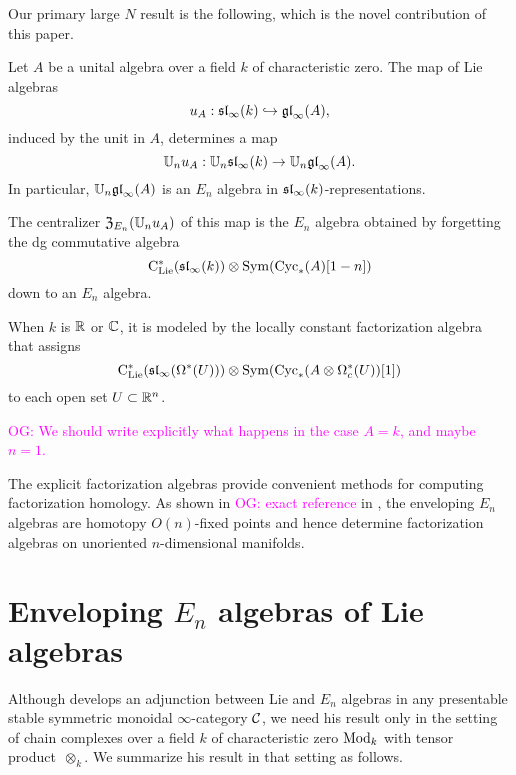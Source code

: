 \documentclass[11pt]{amsart}
\numberwithin{equation}{section}
\def\owen{\textcolor{magenta}{OG: }\textcolor{magenta}}
\begin{document}
Our primary large $N$ result is the following, which is the novel contribution of this paper.

\begin{thm}
\label{thm: large N}
Let $A$ be a unital algebra over a field $k$ of characteristic zero. 
The map of Lie algebras
\[
u_A: \sl_\infty(k) \hookrightarrow \gl_\infty(A),
\]
induced by the unit in $A$, determines a map 
\[
\UU_nu_A: \UU_n\sl_\infty(k) \to \UU_n\gl_\infty(A).
\]
In particular, $\UU_n\gl_\infty(A)$ is an $E_n$ algebra in $\sl_\infty(k)$-representations.

The centralizer ${\frak Z}_{E_n}(\UU_nu_A)$ of this map is the $E_n$ algebra obtained by forgetting the dg commutative algebra
\[
\clies(\sl_\infty(k)) \otimes \Sym(\Cyc_*(A)[1-n])
\]
down to an $E_n$ algebra.

When $k$ is $\RR$ or $\CC$, 
it is modeled by the locally constant factorization algebra that assigns
\[
\clies(\sl_\infty(\Omega^*(U)))\otimes \Sym(\Cyc_*(A \otimes \Omega^*_c(U))[1])
\]
to each open set $U \subset \RR^n$.
\end{thm}

\owen{We should write explicitly what happens in the case $A = k$, and maybe $n=1$.}

The explicit factorization algebras provide convenient methods for computing factorization homology.
As shown in \owen{exact reference} in \cite{Knudsen}, 
the enveloping $E_n$ algebras are homotopy $O(n)$-fixed points and hence determine factorization algebras on unoriented $n$-dimensional manifolds.

\section{Enveloping $E_n$ algebras of Lie algebras}

Although \cite{Knudsen} develops an adjunction between Lie and $E_n$ algebras in any presentable stable symmetric monoidal $\infty$-category $\cC$,
we need his result only in the setting of chain complexes over a field $k$ of characteristic zero $\Mod_k$ with tensor product~$\otimes_k$.
We summarize his result in that setting as follows.

\def\oblv{{\rm oblv}}
\def\Free{{\rm Free}}
\end{document}
